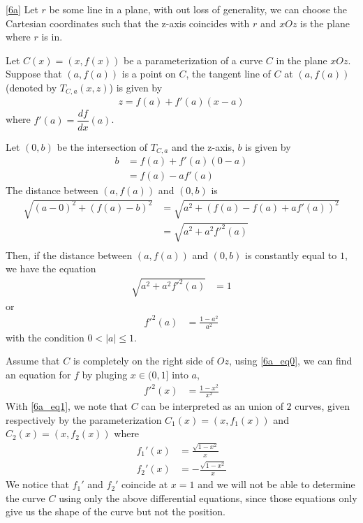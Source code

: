 \documentclass[a4paper]{report}
\begin{document}
\ref{6a} Let $r$ be some line in a plane, with out loss of generality, we can choose the Cartesian coordinates such that the z-axis coincides with $r$ and $xOz$ is the plane where $r$ is in.

Let $C(x) = (x,f(x))$ be a parameterization of a curve $C$ in the plane $xOz$. Suppose that $(a,f(a))$ is a point on $C$, the tangent line of $C$ at $(a,f(a))$ (denoted by $T_{C,a}(x,z)$) is given by
\begin{align}
	z = f(a) + f'(a)(x-a)
\end{align}
where $f'(a) = \dfrac{df}{dx}(a)$.

Let $(0,b)$ be the intersection of $T_{C,a}$ and the z-axis, $b$ is given by
\begin{align}
	b &= f(a) + f'(a)(0-a)\\
	&= f(a) - af'(a)
\end{align}
The distance between $(a,f(a))$ and $(0,b)$ is
\begin{align}
	\sqrt{\left(a - 0\right)^2 + \left(f(a) - b\right)^2} &= \sqrt{a^2 + \left(f(a) - f(a) + af'(a)\right)^2}\\
	 &= \sqrt{a^2 + a^2{f'}^2(a)}\\
\end{align}
Then, if the distance between $(a,f(a))$ and $(0,b)$ is constantly equal to $1$, we have the equation
\begin{align}
	\sqrt{a^2 + a^2{f'}^2(a)} &= 1
\end{align}
or
\begin{align}
{f'}^2(a) &= \frac{1 - a^2}{a^2} \label{6a_eq0}
\end{align}
with the condition $0<\lvert a \rvert \leq 1$.

Assume that $C$ is completely on the right side of $Oz$, using \eqref{6a_eq0}, we can find an equation for $f$ by pluging $x\in (0,1]$ into $a$,
\begin{align}
	{f'}^2(x) &= \frac{1 - x^2}{x^2} \label{6a_eq1}
\end{align}
With \eqref{6a_eq1}, we note that $C$ can be interpreted as an union of $2$ curves, given respectively by the parameterization $C_1(x)=(x,f_1(x))$ and $C_2(x)=(x,f_2(x))$ where
\begin{align}
	f_1'(x) &= \frac{\sqrt{1 - x^2}}{x} \label{6a_f11}\\
	f_2'(x) &= -\frac{\sqrt{1 - x^2}}{x}\label{6a_f21}
\end{align}
We notice that $f_1'$ and $f_2'$ coincide at $x = 1$ and we will not be able to determine the curve $C$ using only the above differential equations, since those equations only give us the shape of the curve but not the position.
\end{document}

